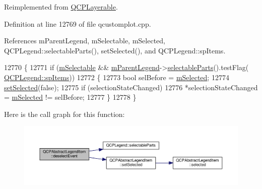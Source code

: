 Reimplemented from \hyperlink{class_q_c_p_layerable_ae546370644a5551c76af739afc008bee}{Q\+C\+P\+Layerable}.



Definition at line 12769 of file qcustomplot.\+cpp.



References m\+Parent\+Legend, m\+Selectable, m\+Selected, Q\+C\+P\+Legend\+::selectable\+Parts(), set\+Selected(), and Q\+C\+P\+Legend\+::sp\+Items.


\begin{DoxyCode}
12770 \{
12771   \textcolor{keywordflow}{if} (\hyperlink{class_q_c_p_abstract_legend_item_aa84029f57b1b32f642fb7db63c3fc2c2}{mSelectable} && \hyperlink{class_q_c_p_abstract_legend_item_aafcd9fc6fcb10f4a8d46037011afafe8}{mParentLegend}->\hyperlink{class_q_c_p_legend_aa90c7fdbad7a0e93527bafb1f1f49a43}{selectableParts}().testFlag(
      \hyperlink{class_q_c_p_legend_a5404de8bc1e4a994ca4ae69e2c7072f1a768bfb95f323db4c66473375032c0af7}{QCPLegend::spItems}))
12772   \{
12773     \textcolor{keywordtype}{bool} selBefore = \hyperlink{class_q_c_p_abstract_legend_item_ae58ebebbd0c36cc6fe897483369984d2}{mSelected};
12774     \hyperlink{class_q_c_p_abstract_legend_item_a6eed93b0ab99cb3eabb043fb08179c2b}{setSelected}(\textcolor{keyword}{false});
12775     \textcolor{keywordflow}{if} (selectionStateChanged)
12776       *selectionStateChanged = \hyperlink{class_q_c_p_abstract_legend_item_ae58ebebbd0c36cc6fe897483369984d2}{mSelected} != selBefore;
12777   \}
12778 \}
\end{DoxyCode}


Here is the call graph for this function\+:\nopagebreak
\begin{figure}[H]
\begin{center}
\leavevmode
\includegraphics[width=350pt]{class_q_c_p_abstract_legend_item_ae64e667e7c5b85cd92c9b91928faef28_cgraph}
\end{center}
\end{figure}


\hypertarget{class_q_c_p_abstract_legend_item_a97dedc084c672359710f16b31d046d1d}{}
